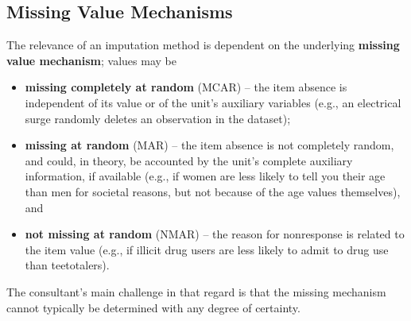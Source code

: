 \subsection{Missing Value Mechanisms} The relevance of an imputation method is dependent on the underlying \textbf{missing value mechanism}; values may be 
\begin{itemize}[noitemsep]
\item \textbf{missing completely at random} (MCAR) -- the item absence is independent of its value or of the unit's auxiliary variables (e.g., an electrical surge randomly deletes an observation in the dataset); 
\item \textbf{missing at random} (MAR) -- the item absence is not completely random, and could, in theory, be accounted by the unit's complete auxiliary information, if available (e.g., if women are less likely to tell you their age than men for societal reasons, but not because of the age values  themselves), and 
\item \textbf{not missing at random} (NMAR) -- the reason for nonresponse is related to the item value (e.g., if illicit drug users are less likely to admit to drug use than teetotalers).
\end{itemize}
The consultant's main challenge in that regard is that the missing mechanism cannot typically be determined with any degree of certainty.
